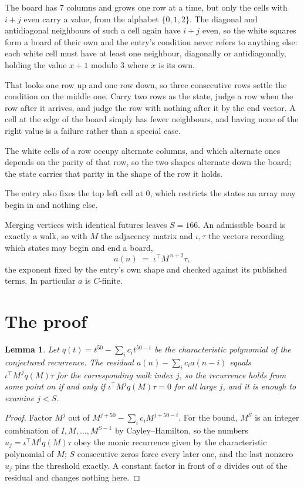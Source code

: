 \documentclass[11pt,a4paper]{article}
\theoremstyle{plain}
\newtheorem{lemma}[theorem]{Lemma}
\theoremstyle{definition}
\begin{document}
The board has $7$ columns and grows one row at a time, but only the cells with $i+j$ even carry a value, from the alphabet $\{0,1,2\}$. The diagonal and antidiagonal neighbours of such a cell again have $i+j$ even, so the white squares form a board of their own and the entry's condition never refers to anything else: each white cell must have at least one neighbour, diagonally or antidiagonally, holding the value $x+1$ modulo $3$ where $x$ is its own.

That looks one row up and one row down, so three consecutive rows settle the condition on the middle one. Carry two rows as the state, judge a row when the row after it arrives, and judge the row with nothing after it by the end vector. A cell at the edge of the board simply has fewer neighbours, and having none of the right value is a failure rather than a special case.

The white cells of a row occupy alternate columns, and which alternate ones depends on the parity of that row, so the two shapes alternate down the board; the state carries that parity in the shape of the row it holds.

The entry also fixes the top left cell at $0$, which restricts the states an array may begin in and nothing else.

Merging vertices with identical futures leaves $S=166$. An admissible board is exactly a walk, so with $M$ the adjacency matrix and $\iota,\tau$ the vectors recording which states may begin and end a board,
\[
a(n)\;=\;\iota^{\!\top}M^{\,n+2}\tau ,
\]
the exponent fixed by the entry's own shape and checked against its published terms. In
particular $a$ is $C$-finite.

\section{The proof}

\begin{lemma}\label{lem:crit}
Let $q(t)=t^{50}-\sum_i c_it^{50-i}$ be the characteristic polynomial of the
conjectured recurrence. The residual $a(n)-\sum_ic_ia(n-i)$ equals
$\iota^{\!\top}M^{\,j}q(M)\tau$ for the corresponding walk index $j$, so the recurrence
holds from some point on if and only if $\iota^{\!\top}M^{j}q(M)\tau=0$ for all large $j$,
and it is enough to examine $j<S$.
\end{lemma}

\begin{proof}
Factor $M^{j}$ out of $M^{j+50}-\sum_ic_iM^{j+50-i}$. For the bound, $M^{S}$
is an integer combination of $I,M,\dots,M^{S-1}$ by Cayley--Hamilton, so the numbers
$u_j=\iota^{\!\top}M^{j}q(M)\tau$ obey the monic recurrence given by the characteristic
polynomial of $M$; $S$ consecutive zeros force every later one, and the last nonzero $u_j$
pins the threshold exactly. A constant factor in front of $a$ divides out of the residual and
changes nothing here.
\end{proof}
\end{document}
